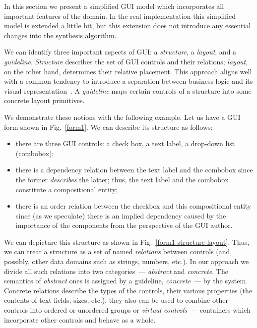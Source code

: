 
In this section we present a simplified GUI model which incorporates all important features of the
domain. In the real implementation this simplified model is extended a little bit, but this extension
does not introduce any essential changes into the synthesis algorithm.

We can identify three important aspects of GUI: a \emph{structure}, a \emph{layout}, and a \emph{guideline}.
\emph{Structure} describes the set of GUI controls and their relations; \emph{layout}, on the other hand, determines
their relative placement. This approach aligns well with a common tendency to introduce a separation between business
logic and its visual representation~\cite{UI3}. A \emph{guideline} maps certain controls of a structure into some concrete
layout primitives.

We demonstrate these notions with the following example. Let us have a GUI form shown in Fig.~\ref{form1}. We can describe its structure as follows:

\begin{itemize}
\item there are three GUI controls: a check box, a text label, a drop-down list (combobox);
\item there is a dependency relation between the text label and the combobox since the former \emph{describes} the
  latter; thus, the text label and the combobox constitute a compositional entity;
\item there is an order relation between the checkbox and this compositional entity
  since (as we speculate) there is an implied dependency caused by the importance of the components
  from the perspective of the GUI author.
\end{itemize}

We can depicture this structure as shown in Fig.~\ref{form1-structure-layout}.
Thus, we can treat a structure as a set of named \emph{relations} between controls (and, possibly, other
data domains such as strings, numbers, etc.). In our approach we divide all such relations into two categories~---
\emph{abstract} and \emph{concrete}. The semantics of \emph{abstract} ones is assigned by a guideline, \emph{concrete}~---
by the system. Concrete relations describe the types of the controls, their various properties (the contents of
text fields, sizes, etc.); they also can be used to combine other controls into ordered or unordered groups or
\emph{virtual controls}~--- containers which incorporate other controls and behave as a whole.

